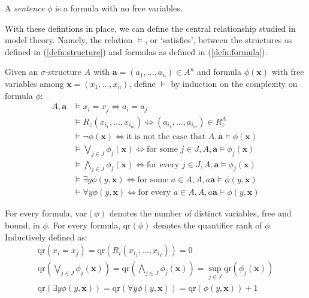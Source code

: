 \begin{defn}
A \textit{sentence} $\phi$ is a formula with no free variables.
\end{defn}
With these defintions in place, we can define the central relationship studied in model theory. Namely, the relation $\vDash$, or `satisfies', between the structures as defined in (\ref{defn:structure}) and formulas as defined in (\ref{defn:formula}).
\begin{defn}
Given an $\sigma$-structure $A$ with $\mathbf{a} = (a_{1},\dots,a_{n}) \in A^{n}$ and formula $\phi(\mathbf{x})$ with free variables among $\mathbf{x} = (x_{1},\dots,x_{n})$, define $\vDash$ by induction on the complexity on formula $\phi$:
\begin{align*}
A,\mathbf{a} &\vDash x_{i} = x_{j} \Leftrightarrow a_{i} = a_{j} \\
 &\vDash R_{z}(x_{i_{1}},\dots,x_{i_{m}}) \Leftrightarrow (a_{i_{1}},\dots,a_{i_{m}}) \in R_{z}^{A} \\
 &\vDash \neg \phi(\mathbf{x}) \Leftrightarrow \text{it is not the case that } A,\mathbf{a} \vDash \phi(\mathbf{x}) \\
 &\vDash \bigvee_{j \in J} \phi_{j}(\mathbf{x}) \Leftrightarrow \text{for some } j \in J,  A,\mathbf{a} \vDash \phi_{j}(\mathbf{x}) \\
 &\vDash \bigwedge_{j \in J} \phi_{j}(\mathbf{x}) \Leftrightarrow \text{for every } j \in J,  A,\mathbf{a} \vDash \phi_{j}(\mathbf{x}) \\
 &\vDash \exists y \phi(y,\mathbf{x}) \Leftrightarrow \text{for some } a \in A,  A,a\mathbf{a} \vDash \phi(y,\mathbf{x}) \\
 &\vDash \forall y \phi(y,\mathbf{x}) \Leftrightarrow \text{for every } a \in A,  A,a\mathbf{a} \vDash \phi(y,\mathbf{x}) 
\end{align*}
\end{defn}
For every formula, $\text{var}(\phi)$ denotes the number of distinct variables, free and bound, in $\phi$. For every formula, $\text{qr}(\phi)$ denotes the quantifier rank of $\phi$. Inductively defined as:
\begin{eqnarray*}
\text{qr}(x_{i} = x_{j}) = \text{qr}(R_{i}(x_{i_{1}},\dots,x_{i_{k}})) = 0 \\
\text{qr}(\bigvee_{j \in J} \phi_{j}(\mathbf{x})) = \text{qr}(\bigwedge_{j \in J} \phi_{j}(\mathbf{x}))  = \sup_{j \in J} \text{qr}(\phi_{j}(\mathbf{x})) \\
\text{qr}(\exists y \phi(y,\mathbf{x})) = \text{qr}(\forall y \phi(y,\mathbf{x})) = \text{qr}(\phi(y,\mathbf{x})) + 1 
\end{eqnarray*}
